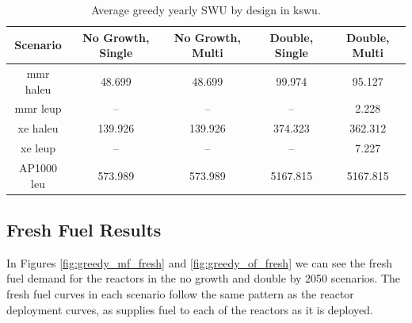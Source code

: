\begin{table}[H]
  \centering
  \caption{Average greedy yearly SWU by design in k\gls{swu}.}
  \label{tab:greedy_swu_avg}
  \begin{tabular}{c c c c c}
     \hline
     Scenario & No Growth, Single & No Growth, Multi & Double, Single & Double, Multi  \\
     \hline
     \gls{mmr} \gls{haleu}   & 48.699  & 48.699  & 99.974   & 95.127   \\
     \gls{mmr} \gls{leup}    & --      & --      & --       & 2.228    \\
     \gls{xe} \gls{haleu}    & 139.926 & 139.926 & 374.323  & 362.312  \\
     \gls{xe} \gls{leup}     & --      & --      & --       & 7.227    \\
     AP1000 \gls{leu}        & 573.989 & 573.989 & 5167.815 & 5167.815 \\
     \hline
  \end{tabular}
\end{table}



\subsection{Fresh Fuel Results}
\label{sec:greedy_fresh}

In Figures \ref{fig:greedy_mf_fresh} and \ref{fig:greedy_of_fresh} we can see the fresh fuel demand for the reactors in the no growth and double by 2050 scenarios. The fresh fuel curves in each scenario follow the same pattern as the reactor deployment curves, as \cyclus supplies fuel to each of the reactors as it is deployed.


